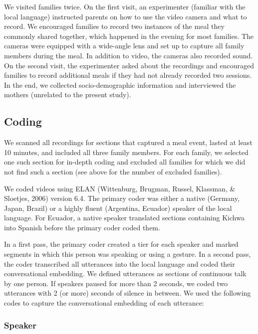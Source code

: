 \documentclass[
  man,floatsintext]{apa6}
\begin{document}
We visited families twice. On the first visit, an experimenter (familiar with the local language) instructed parents on how to use the video camera and what to record. We encouraged families to record two instances of the meal they commonly shared together, which happened in the evening for most families. The cameras were equipped with a wide-angle lens and set up to capture all family members during the meal. In addition to video, the cameras also recorded sound. On the second visit, the experimenter asked about the recordings and encouraged families to record additional meals if they had not already recorded two sessions. In the end, we collected socio-demographic information and interviewed the mothers (unrelated to the present study).

\hypertarget{coding}{%
\subsection{Coding}\label{coding}}

We scanned all recordings for sections that captured a meal event, lasted at least 10 minutes, and included all three family members. For each family, we selected one such section for in-depth coding and excluded all families for which we did not find such a section (see above for the number of excluded families).

We coded videos using ELAN (Wittenburg, Brugman, Russel, Klassman, \& Sloetjes, 2006) version 6.4. The primary coder was either a native (Germany, Japan, Brazil) or a highly fluent (Argentina, Ecuador) speaker of the local language. For Ecuador, a native speaker translated sections containing Kichwa into Spanish before the primary coder coded them.

In a first pass, the primary coder created a tier for each speaker and marked segments in which this person was speaking or using a gesture. In a second pass, the coder transcribed all utterances into the local language and coded their conversational embedding. We defined utterances as sections of continuous talk by one person. If speakers paused for more than 2 seconds, we coded two utterances with 2 (or more) seconds of silence in between. We used the following codes to capture the conversational embedding of each utterance:

\hypertarget{speaker}{%
\subsubsection{Speaker}\label{speaker}}
\end{document}
